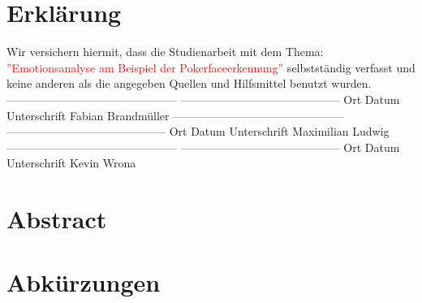 \documentclass[12pt, a4paper]{report}
\begin{document}

\setlength{\parindent}{0em} 
\let\cleardoublepage\relax
{}


\section*{Erklärung}
Wir versichern hiermit, dass die Studienarbeit mit dem Thema: \textcolor{red}{''Emotionsanalyse am Beispiel der Pokerfaceerkennung''} selbstständig verfasst und keine anderen als die angegeben Quellen und Hilfsmittel benutzt wurden.
\newline
\newline
\newline
\newline
---------------------------------------------       ------------------------------------------ \newline
Ort	\hspace{2cm}		Datum\hspace{3,5 cm}				    Unterschrift Fabian Brandmüller
\newline
\newline
\newline
---------------------------------------------       ------------------------------------------ \newline
Ort	\hspace{2cm}		Datum\hspace{3,5 cm}				    Unterschrift Maximilian Ludwig
\newline
\newline
\newline
---------------------------------------------       ------------------------------------------ \newline
Ort	\hspace{2cm}		Datum\hspace{3,5 cm}				    Unterschrift Kevin Wrona
\newpage
\section*{Abstract}
\section*{Abkürzungen}
\begin{acronym}[Bash]
\end{acronym}
\newpage
\renewcommand{\thefigure}{\Alph{figure}}
\renewcommand{\thetable}{\Alph{figure}}
\end{document}
